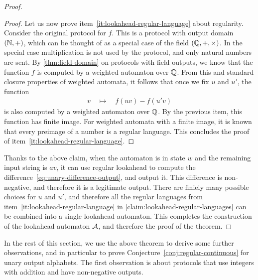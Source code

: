 \begin{proof}
\begin{proof}
  
  Let us now prove item~\ref{it:lookahead-regular-language} about regularity.
  Consider the original protocol for $f$. This is a protocol with output domain $({\mathbb N},+)$, which can be thought of as a special case of  the field $({\mathbb Q},+, \times)$. In the special case multiplication is not used by the protocol, and only natural numbers are sent. By \cref{thm:field-domain} on protocols with field outputs, we know that the function $f$ is computed by a weighted automaton over ${\mathbb Q}$. From this and standard closure properties of weighted automata, it follows that once we fix $u$ and $u'$,  the function 
  \begin{align*}
  v \quad \mapsto \quad f(uv) - f(u' v)
  \end{align*}
  is also computed by a weighted automaton over ${\mathbb Q}$. By the previous item, this function has finite image. For weighted automata with a finite image, it is known that every preimage of a number is a regular language. This concludes the proof of item~\ref{it:lookahead-regular-language}.
\end{proof}

Thanks to the above claim, when the automaton is in state $w$ and the remaining input string is $av$, it can use regular lookahead to compute the difference~\eqref{eq:unary-difference-output}, and output it. This difference is non-negative, and therefore it is a legitimate output. There are finiely many possible choices for $u$ and $u'$, and therefore all  the regular languages from item~\ref{it:lookahead-regular-language} in \cref{claim:lookahead-regular-languages} can be combined into a single lookahead automaton. This completes the construction of the lookahead automaton ${\mathcal A}$, and therefore the proof of the theorem.
\end{proof}

In the rest of this section, we use the above theorem to derive some further observations, and in particular to prove Conjecture~\ref{conj:regular-continuous} for unary output alphabets. The first observation is about protocols that use integers with addition and have non-negative outputs.

